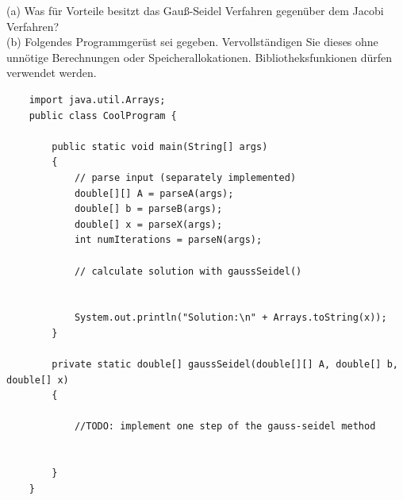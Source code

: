 \documentclass{scrartcl}
\begin{document}
	(a) 
	Was für Vorteile besitzt das Gauß-Seidel Verfahren gegenüber dem Jacobi Verfahren?
	\lbreak \lbreak
	\\
	(b)
	Folgendes Programmgerüst sei gegeben. Vervollständigen Sie dieses ohne unnötige Berechnungen oder Speicherallokationen. Bibliotheksfunkionen dürfen  verwendet werden.
	\begin{lstlisting}
	import java.util.Arrays;
	public class CoolProgram {
			
		public static void main(String[] args) 
		{
			// parse input (separately implemented)
			double[][] A = parseA(args); 
			double[] b = parseB(args);
			double[] x = parseX(args);
			int numIterations = parseN(args);
				
			// calculate solution with gaussSeidel()
				
				
			System.out.println("Solution:\n" + Arrays.toString(x));
		}
			
		private static double[] gaussSeidel(double[][] A, double[] b, double[] x) 
		{
			
			//TODO: implement one step of the gauss-seidel method
			
			
		}
	}
	\end{lstlisting}
\end{document}
